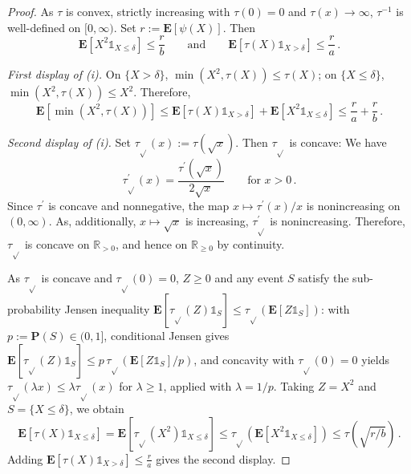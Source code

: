\documentclass{article}
\newcommand{\R}{\mathbb{R}}
\newcommand{\Rp}{\R_{\geq0}}
\newcommand{\Rpp}{\R_{>0}}
\newcommand{\lab}{\left[} %
\newcommand{\rab}{\right]} %
\newcommand{\ab}[1]{\lab #1 \rab} %
\newcommand{\abOf}[1]{\!\ab{#1}} %
\newcommand{\lb}{\left(} %
\newcommand{\rb}{\right)} %
\newcommand{\br}[1]{\lb #1 \rb} %
\newcommand{\brOf}[1]{\!\br{#1}} %
\renewcommand{\Pr}{\mathbf{P}} %
\newcommand{\Prof}[1]{\Pr(#1)}
\newcommand{\E}{\mathbf{E}} %
\newcommand{\Eof}[1]{\E[#1]}
\newcommand{\EOf}[1]{\E\abOf{#1}}
\newcommand{\pr}{^\prime}
\newcommand{\ind}{\mathds{1}}%
\newcommand{\indOf}[1]{\ind_{\!#1}}%
\newcommand{\eqfs}{\,.}
\newcommand{\tran}{\tau}
\newcommand{\dtran}{\tau\pr}
\newcommand{\trans}{\tau_{\sqrt{}}}
\newcommand{\dtrans}{\tau\pr_{\sqrt{}}}
\begin{document}
\begin{proof}
    As $\tran$ is convex, strictly increasing with $\tran(0)=0$ and $\tran(x)\to\infty$, $\tran^{-1}$ is well-defined on $[0,\infty)$.
    Set $r:=\Eof{\psi(X)}$. Then
    \begin{equation}
        \EOf{X^2\indOf{X\leq\delta}}\leq\frac{r}{b}
        \qquad\text{and}\qquad
        \EOf{\tran(X)\indOf{X>\delta}}\leq\frac{r}{a}
        \eqfs
    \end{equation}
    
    \emph{First display of (i).}
    On $\{X>\delta\}$, $\min\brOf{X^2,\tran(X)}\leq\tran(X)$; on
    $\{X\leq\delta\}$, $\min\brOf{X^2,\tran(X)}\leq X^2$. Therefore, 
    \begin{equation}
        \EOf{\min\brOf{X^2,\tran(X)}}
        \leq \EOf{\tran(X)\indOf{X>\delta}}
        + \EOf{X^2\indOf{X\leq\delta}}
        \leq \frac{r}{a}+\frac{r}{b}
        \eqfs
    \end{equation}
    
    \emph{Second display of (i).}
    Set $\trans(x):=\tran(\sqrt x)$. Then $\trans$ is concave:
    We have 
    \begin{equation}
        \dtrans(x)
        =
        \frac{\dtran(\sqrt x)}{2\sqrt x}
        \qquad\text{for }x>0\eqfs
    \end{equation}
    Since $\dtran$ is concave and nonnegative, the map
    $x\mapsto \dtran(x)/x$ is nonincreasing on $(0,\infty)$.
    As, additionally, $x\mapsto\sqrt x$ is increasing, $\dtrans$ is nonincreasing. Therefore, $\trans$ is
    concave on $\Rpp$, and hence on $\Rp$ by continuity.
    
    As $\trans$ is concave and $\trans(0) = 0$, $Z\geq0$ and any event $S$ satisfy the sub-probability Jensen inequality
    $\Eof{\trans(Z)\indOf{S}}\leq \trans\brOf{\EOf{Z\indOf{S}}}$: with $p:=\Prof{S}\in(0,1]$,
    conditional Jensen gives $\Eof{\trans(Z)\indOf S}\leq p\,\trans\brOf{\EOf{Z\indOf S}/p}$,
    and concavity with $\trans(0)=0$ yields $\trans(\lambda x)\leq\lambda \trans(x)$ for
    $\lambda\geq1$, applied with $\lambda=1/p$. Taking $Z=X^2$ and
    $S=\{X\leq\delta\}$, we obtain
    \begin{equation}
        \EOf{\tran(X)\indOf{X\leq\delta}}
        =\EOf{\trans(X^2)\indOf{X\leq\delta}}
        \leq \trans\brOf{\EOf{X^2\indOf{X\leq\delta}}}
        \leq \tran\brOf{\sqrt{r/b}}
        \eqfs
    \end{equation}
    Adding $\Eof{\tran(X)\indOf{X>\delta}}\leq\frac{r}{a}$ gives the second display.
    

\end{proof}
\end{document}
